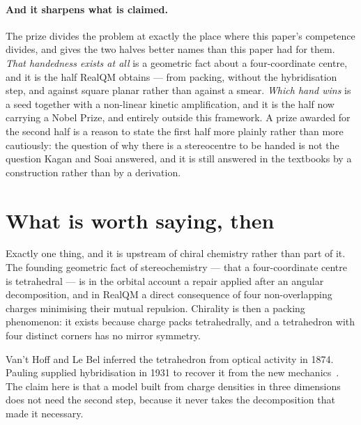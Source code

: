 \documentclass[11pt]{article}
\begin{document}
\paragraph{And it sharpens what is claimed.} The prize divides the problem at exactly the place
where this paper's competence divides, and gives the two halves better names than this paper had
for them. \emph{That handedness exists at all} is a geometric fact about a four-coordinate centre,
and it is the half RealQM obtains --- from packing, without the hybridisation step, and against
square planar rather than against a smear. \emph{Which hand wins} is a seed together with a
non-linear kinetic amplification, and it is the half now carrying a Nobel Prize, and entirely
outside this framework. A prize awarded for the second half is a reason to state the first half more
plainly rather than more cautiously: the question of why there is a stereocentre to be handed is not
the question Kagan and Soai answered, and it is still answered in the textbooks by a construction
rather than by a derivation.

\section{What is worth saying, then}

Exactly one thing, and it is upstream of chiral chemistry rather than part of it. The founding
geometric fact of stereochemistry --- that a four-coordinate centre is tetrahedral --- is in the
orbital account a repair applied after an angular decomposition, and in RealQM a direct consequence
of four non-overlapping charges minimising their mutual repulsion. Chirality is then a packing
phenomenon: it exists because charge packs tetrahedrally, and a tetrahedron with four distinct
corners has no mirror symmetry.

Van't Hoff and Le Bel inferred the tetrahedron from optical activity in 1874. Pauling supplied
hybridisation in 1931 to recover it from the new mechanics~\cite{Pauling1931}. The claim here is that a model built
from charge densities in three dimensions does not need the second step, because it never takes the
decomposition that made it necessary.
\end{document}
